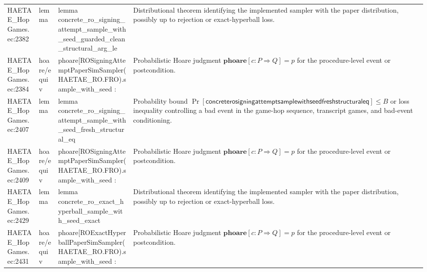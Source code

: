 \documentclass[10pt]{article}
\begin{document}
\begin{longtable}{L{0.11\textwidth}L{0.055\textwidth}L{0.385\textwidth}L{0.41\textwidth}}
HAETAE\_\allowbreak{}HopGames.\allowbreak{}ec:\allowbreak{}2382 & lemma & {\ttfamily\scriptsize lemma concrete\_\allowbreak{}ro\_\allowbreak{}signing\_\allowbreak{}attempt\_\allowbreak{}sample\_\allowbreak{}with\_\allowbreak{}seed\_\allowbreak{}guarded\_\allowbreak{}clean\_\allowbreak{}structural\_\allowbreak{}arg\_\allowbreak{}le} & Distributional theorem identifying the implemented sampler with the paper distribution, possibly up to rejection or exact-hyperball loss. \\
HAETAE\_\allowbreak{}HopGames.\allowbreak{}ec:\allowbreak{}2384 & hoare/equiv & {\ttfamily\scriptsize phoare[ROSigningAttemptPaperSimSampler(HAETAE\_\allowbreak{}RO.FRO).sample\_\allowbreak{}with\_\allowbreak{}seed :} & Probabilistic Hoare judgment $\mathbf{phoare}[c:P\Rightarrow Q]=p$ for the procedure-level event or postcondition. \\
HAETAE\_\allowbreak{}HopGames.\allowbreak{}ec:\allowbreak{}2407 & lemma & {\ttfamily\scriptsize lemma concrete\_\allowbreak{}ro\_\allowbreak{}signing\_\allowbreak{}attempt\_\allowbreak{}sample\_\allowbreak{}with\_\allowbreak{}seed\_\allowbreak{}fresh\_\allowbreak{}structural\_\allowbreak{}eq} & Probability bound $\Pr[\mathsf{concreterosigningattemptsamplewithseedfreshstructuraleq}]\le B$ or loss inequality controlling a bad event in the game-hop sequence, transcript games, and bad-event conditioning. \\
HAETAE\_\allowbreak{}HopGames.\allowbreak{}ec:\allowbreak{}2409 & hoare/equiv & {\ttfamily\scriptsize phoare[ROSigningAttemptPaperSimSampler(HAETAE\_\allowbreak{}RO.FRO).sample\_\allowbreak{}with\_\allowbreak{}seed :} & Probabilistic Hoare judgment $\mathbf{phoare}[c:P\Rightarrow Q]=p$ for the procedure-level event or postcondition. \\
HAETAE\_\allowbreak{}HopGames.\allowbreak{}ec:\allowbreak{}2429 & lemma & {\ttfamily\scriptsize lemma concrete\_\allowbreak{}ro\_\allowbreak{}exact\_\allowbreak{}hyperball\_\allowbreak{}sample\_\allowbreak{}with\_\allowbreak{}seed\_\allowbreak{}exact} & Distributional theorem identifying the implemented sampler with the paper distribution, possibly up to rejection or exact-hyperball loss. \\
HAETAE\_\allowbreak{}HopGames.\allowbreak{}ec:\allowbreak{}2431 & hoare/equiv & {\ttfamily\scriptsize phoare[ROExactHyperballPaperSimSampler(HAETAE\_\allowbreak{}RO.FRO).sample\_\allowbreak{}with\_\allowbreak{}seed :} & Probabilistic Hoare judgment $\mathbf{phoare}[c:P\Rightarrow Q]=p$ for the procedure-level event or postcondition. \\

\end{longtable}
\end{document}
